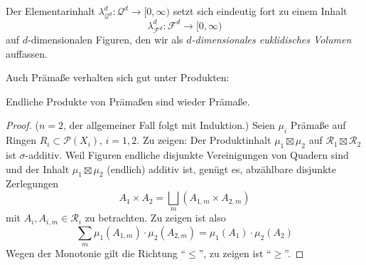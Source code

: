 \begin{hauptbsp}
Der Elementarinhalt $\lambda^d_{\mathcal{Q}^d}: \mathcal{Q}^d \longrightarrow [0,\infty)$ setzt sich eindeutig fort zu einem Inhalt
$$
\lambda^d_{\mathcal{F}^d}: \mathcal{F}^d \longrightarrow [0,\infty)
$$
auf $d$-dimensionalen Figuren, den wir als \emph{$d$-dimensionales euklidisches Volumen} auffassen.
\end{hauptbsp}

Auch Prämaße verhalten sich gut unter Produkten:

\begin{satz}
\begin{mdframed}
Endliche Produkte von Prämaßen sind wieder Prämaße.
\end{mdframed}
\begin{proof}
($n=2$, der allgemeiner Fall folgt mit Induktion.)   \newline
Seien $\mu_i$ Prämaße auf Ringen $R_i \subset \mathcal{P}(X_i)$, $i=1,2$. Zu zeigen: Der Produktinhalt $\mu_1 \boxtimes \mu_2$ auf $\mathcal{R}_1 \boxtimes \mathcal{R}_2$ ist $\sigma$-additiv. Weil Figuren endliche disjunkte Vereinigungen von Quadern sind und der Inhalt $\mu_1 \boxtimes \mu_2$ (endlich) additiv ist, genügt es, abzählbare disjunkte Zerlegungen
$$
A_1 \times A_2 = \bigsqcup_m (A_{1,m} \times A_{2,m})
$$
mit $A_i, A_{i,m} \in \mathcal{R}_i$ zu betrachten. Zu zeigen ist also
$$
\sum_m \mu_1(A_{1,m}) \cdot \mu_2(A_{2,m}) = \mu_1 (A_1) \cdot \mu_2(A_2)
$$
Wegen der Monotonie gilt die Richtung ``$\leq$'', zu zeigen ist ``$\geq$''.
\end{proof}
\end{satz}


%

